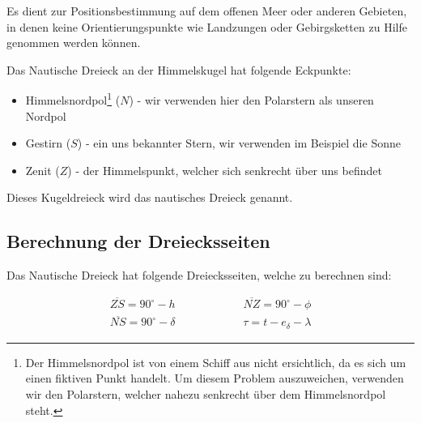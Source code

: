 \begin{refsection}
Es dient zur Positionsbestimmung auf dem offenen Meer oder anderen Gebieten, in denen keine Orientierungspunkte wie Landzungen oder Gebirgsketten zu Hilfe genommen werden können.

Das Nautische Dreieck an der Himmelskugel hat folgende Eckpunkte:
\begin{itemize}
\item Himmelsnordpol\footnote{%
Der Himmelsnordpol ist von einem Schiff aus nicht ersichtlich, da es sich um einen fiktiven Punkt handelt. Um diesem Problem auszuweichen, verwenden wir den Polarstern, welcher nahezu senkrecht über dem Himmelsnordpol steht.}
 ($N$) - wir verwenden hier den Polarstern als unseren Nordpol
\item Gestirn ($S$) - ein uns bekannter Stern, wir verwenden im Beispiel die Sonne
\item Zenit ($Z$) - der Himmelspunkt, welcher sich senkrecht über uns befindet
\end{itemize}

Dieses Kugeldreieck wird das nautisches Dreieck genannt.


\subsection{Berechnung der Dreiecksseiten}
Das Nautische Dreieck hat folgende Dreiecksseiten, welche zu berechnen sind:

\begin{align*}
\overline{ZS} = 90^{\circ} - h \quad \quad \quad \quad \quad \quad 
\overline{NZ} = 90^{\circ} - \phi \\
\overline{NS} = 90^{\circ} - \delta \quad \quad \quad \quad \quad \quad 
\tau = t - e_\delta - \lambda 
\end{align*}



\end{refsection}
